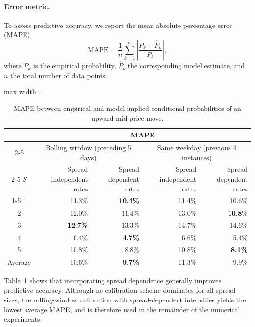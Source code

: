 \documentclass[11pt]{article}
\begin{document}
\paragraph{Error metric.}
To assess predictive accuracy, we report the mean absolute percentage error (MAPE),
\begin{equation}
    \mathrm{MAPE}
    =
    \frac{1}{n}\sum_{k=1}^n 
    \left|\frac{P_k-\hat{P}_k}{P_k}\right|,
\end{equation}
where $P_k$ is the empirical probability, $\hat{P}_k$ the corresponding model estimate, and $n$ the total number of data points.

{\captionsetup{font=small}
\begin{table}[H]
    \centering
        \begin{adjustbox}{max width=\textwidth}
            \begin{tabular}{c r r r r}\toprule
            & \multicolumn{4}{c}{MAPE}\\ \cmidrule{2-5}
             & \multicolumn{2}{c}{Rolling window (preceding 5 days)}& \multicolumn{2}{c}{Same weekday (previous 4 instances)} \\ \cmidrule{2-5}
             $S$ & Spread independent rates & Spread dependent rates & Spread independent rates & Spread dependent rates \\ \cmidrule{1-5}
            1 & 11.3\% & \textcolor{black}{\textbf{10.4\%}} & 11.4\% & 10.6\% \\
            2 & 12.0\% & 11.4\% & 13.0\% & \textcolor{black}{\textbf{10.8}}\% \\
            3 & \textcolor{black}{\textbf{12.7\%}} & 13.3\% & 14.7\% & 14.6\% \\
            4 & 6.4\% & \textcolor{black}{\textbf{4.7\%}} & 6.6\% & 5.4\% \\
            5 & 10.8\% & 8.8\% & 10.8\% & \textcolor{black}{\textbf{8.1\%}} \\ \midrule
            Average & 10.6\% & \textcolor{black}{\textbf{9.7\%}} & 11.3\% & 9.9\% \\ \bottomrule
            \end{tabular}
        \end{adjustbox}
         \caption{MAPE between empirical and model-implied conditional probabilities of an upward mid-price move.}
         \label{tab: MAEMSE_pm}  
\end{table}}

Table~\ref{tab: MAEMSE_pm} shows that incorporating spread dependence generally improves predictive accuracy. Although no calibration scheme dominates for all spread sizes, the rolling-window calibration with spread-dependent intensities yields the lowest average MAPE, and is therefore used in the remainder of the numerical experiments.
\end{document}
